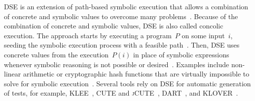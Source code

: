 \documentclass[paper=a4,%
  twoside,%
  BCOR4mm,%
  abstract=true,%
  toc=bibliography,%
  chapterprefix=true,%
  toc=bibliographynumbered,%
  open=right,%
  english,%
  pagesize=pdftex]{scrreprt}
\begin{document}

\ac{DSE} is an extension of path-based symbolic execution that allows a combination of concrete and symbolic values to overcome many problems~\cite{Fraser_2013}. Because of the combination of concrete and symbolic values, \ac{DSE} is also called concolic execution. The approach starts by executing a program~$P$ on some input~$i$, seeding the symbolic execution process with a feasible path~\cite{Gupta2000,Korel1992}. Then, \ac{DSE} uses concrete values from the execution~$P(i)$ in place of symbolic expressions whenever symbolic reasoning is not possible or desired~\cite{Cadar2005}. Examples include non-linear arithmetic or cryptographic hash functions that are virtually impossible to solve for symbolic execution~\cite{Ball2015}. Several tools rely on \ac{DSE} for automatic generation of tests, for example, \textsc{KLEE}~\cite{cadar2008klee}, \textsc{CUTE} and \textsc{jCUTE}~\cite{Sen2006}, \textsc{DART}~\cite{Godefroid_2005}, and \textsc{KLOVER}~\cite{Li2011}. 
\end{document}
